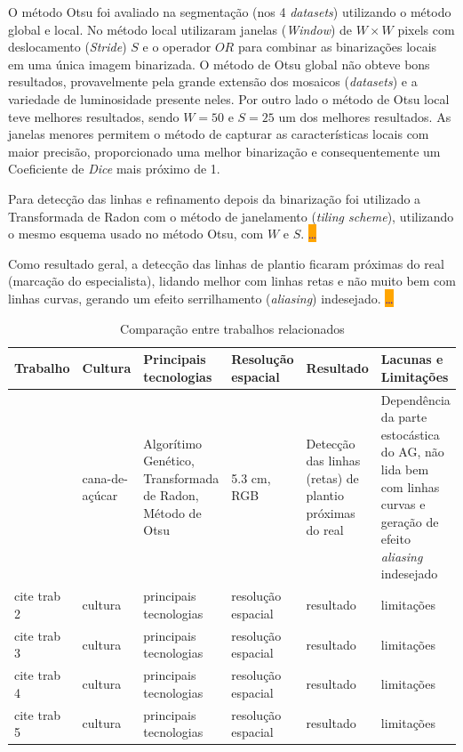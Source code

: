 \documentclass[12pt, a4paper, english, brazil]{article}
\newcommand{\dotsBlue}{\colorbox{orange}{\textcolor{blue}{\dots}}}
\begin{document}
O método Otsu foi avaliado na segmentação (nos 4 \textit{datasets}) utilizando o método global e local. No método local utilizaram janelas (\textit{Window}) de $W \times W$ pixels com deslocamento (\textit{Stride}) $S$ e o operador $OR$ para combinar as binarizações locais em uma única imagem binarizada. O método de Otsu global não obteve bons resultados, provavelmente pela grande extensão dos mosaicos (\textit{datasets}) e a variedade de luminosidade presente neles. Por outro lado o método de Otsu local teve melhores resultados, sendo $W=50$ e $S=25$ um dos melhores resultados. As janelas menores permitem o método de capturar as características locais com maior precisão, proporcionado uma melhor binarização e consequentemente um Coeficiente de \textit{Dice} mais próximo de 1.

Para detecção das linhas e refinamento depois da binarização foi utilizado a Transformada de Radon com o método de janelamento (\textit{tiling scheme}), utilizando o mesmo esquema usado no método Otsu, com $W$ e $S$. \dotsBlue

Como resultado geral, a detecção das linhas de plantio ficaram próximas do real (marcação do especialista), lidando melhor com linhas retas e não muito bem com linhas curvas, gerando um efeito serrilhamento (\textit{aliasing}) indesejado. \dotsBlue

\begin{landscape}
\begin{table}
\centering
\caption{Comparação entre trabalhos relacionados}
\label{tab:trab_rela}
\begin{tabularx}{\linewidth}{|L|L|L|L|L|L|} 
\hline
\textbf{Trabalho} & \textbf{Cultura} & \textbf{Principais tecnologias} & \textbf{Resolução espacial} & \textbf{Resultado} & \textbf{Lacunas e Limitações} \\ \hline
\cite{Silva_Escarpinati_Backes_2021} & cana-de-açúcar & Algorítimo Genético, Transformada de Radon, Método de Otsu & 5.3 cm, RGB & Detecção das linhas (retas) de plantio próximas do real & Dependência da parte estocástica do AG, não lida bem com linhas curvas e geração de efeito \textit{aliasing} indesejado \\ \hline
cite trab 2 & cultura & principais tecnologias & resolução espacial & resultado & limitações \\ \hline
cite trab 3 & cultura & principais tecnologias & resolução espacial & resultado & limitações \\ \hline
cite trab 4 & cultura & principais tecnologias & resolução espacial & resultado & limitações \\ \hline
cite trab 5 & cultura & principais tecnologias & resolução espacial & resultado & limitações \\ \hline
\end{tabularx}
\end{table}
\end{landscape}
\end{document}
